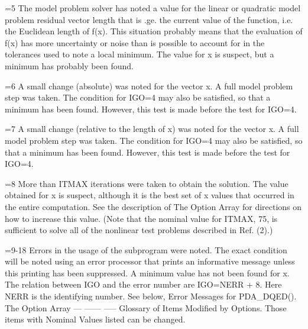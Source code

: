 \documentclass[11pt,twoside,nolof]{starlink}
\begin{document}
\begin{terminalv}
      =5   The  model  problem  solver  has  noted a value for the
  linear or quadratic model problem residual vector length that is
  .ge.  the  current  value  of  the  function, i.e. the Euclidean
  length   of  f(x).   This  situation  probably  means  that  the
  evaluation  of  f(x)  has  more  uncertainty  or  noise  than is
  possible  to  account for in the tolerances used to note a local
  minimum.  The value for x is suspect, but a minimum has probably
  been found.

      =6  A small change (absolute) was noted for the vector x.  A
  full  model problem step was taken.  The condition for IGO=4 may
  also  be  satisfied, so that a minimum has been found.  However,
  this test is made before the test for IGO=4.

      =7   A  small change (relative to the length of x) was noted
  for  the  vector  x.   A full model problem step was taken.  The
  condition for IGO=4 may also be satisfied, so that a minimum has
  been  found.   However,  this  test  is made before the test for
  IGO=4.

      =8   More  than  ITMAX  iterations  were taken to obtain the
  solution.   The  value obtained for x is suspect, although it is
  the   best   set  of  x  values  that  occurred  in  the  entire
  computation.   See  the  description  of  The  Option  Array for
  directions  on  how  to  increase  this  value.   (Note that the
  nominal  value  for ITMAX, 75, is sufficient to solve all of the
  nonlinear test problems described in Ref. (2).)

      =9-18     Errors  in the usage of the subprogram were noted.
  The  exact condition will be noted using an error processor that
  prints  an  informative  message  unless  this printing has been
  suppressed.   A  minimum  value  has  not been found for x.  The
  relation  between  IGO  and  the  error number are IGO=NERR + 8.
  Here  NERR is the identifying number.  See below, Error Messages
  for PDA_DQED().
  The Option Array
  --- ------ -----
  Glossary of Items Modified by Options.  Those items with Nominal
  Values listed can be changed.


\end{terminalv}
\end{document}

